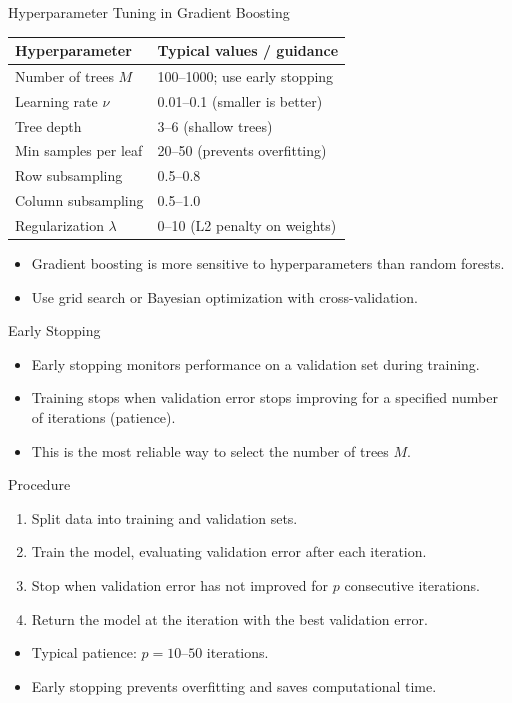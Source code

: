 \begin{frame}{Hyperparameter Tuning in Gradient Boosting}
  \renewcommand{\arraystretch}{1.4}
  \begin{center}
  \begin{tabular}{ll}
    \toprule
    \textbf{Hyperparameter} & \textbf{Typical values / guidance} \\
    \midrule
    Number of trees $M$ & 100--1000; use early stopping \\
    Learning rate $\nu$ & 0.01--0.1 (smaller is better) \\
    Tree depth & 3--6 (shallow trees) \\
    Min samples per leaf & 20--50 (prevents overfitting) \\
    Row subsampling & 0.5--0.8 \\
    Column subsampling & 0.5--1.0 \\
    Regularization $\lambda$ & 0--10 (L2 penalty on weights) \\
    \bottomrule
  \end{tabular}
  \end{center}
  \vspace{0.4em}
  \begin{itemize}
    \item Gradient boosting is more sensitive to hyperparameters than random forests.
    \item Use grid search or Bayesian optimization with cross-validation.
  \end{itemize}
\end{frame}

\begin{frame}{Early Stopping}
  \begin{itemize}
    \item \alert{Early stopping} monitors performance on a validation set during training.
    \item Training stops when validation error stops improving for a specified number of
          iterations (patience).
    \item This is the \alert{most reliable way} to select the number of trees $M$.
  \end{itemize}
  \begin{block}{Procedure}
    \begin{enumerate}
      \item Split data into training and validation sets.
      \item Train the model, evaluating validation error after each iteration.
      \item Stop when validation error has not improved for $p$ consecutive iterations.
      \item Return the model at the iteration with the best validation error.
    \end{enumerate}
  \end{block}
  \begin{itemize}
    \item Typical patience: $p = 10$--$50$ iterations.
    \item Early stopping prevents overfitting and saves computational time.
  \end{itemize}
\end{frame}

